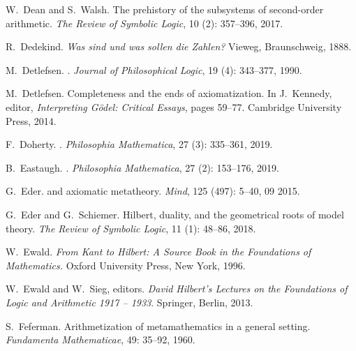 \documentclass[11pt,fleqn,leqno]{article}
\begin{document}
\begin{thebibliography}{118}
W.~Dean and S.~Walsh.
\newblock The prehistory of the subsystems of second-order arithmetic.
\newblock \emph{The Review of Symbolic Logic}, 10 (2):
  357--396, 2017.

R.~Dedekind.
\newblock \emph{Was sind und was sollen die {Z}ahlen?}
\newblock Vieweg, Braunschweig, 1888.

M.~Detlefsen.
.
\newblock \emph{Journal of Philosophical Logic}, 19 (4):
  343--377, 1990.

M.~Detlefsen.
\newblock Completeness and the ends of axiomatization.
\newblock In J.~Kennedy, editor, \emph{Interpreting G{\"o}del: Critical
  Essays}, pages 59--77. Cambridge University Press, 2014.

F.~Doherty.
.
\newblock \emph{Philosophia Mathematica}, 27 (3): 335--361,
  2019.

B.~Eastaugh.
.
\newblock \emph{Philosophia Mathematica}, 27 (2): 153--176,
  2019.

G.~Eder.
 and axiomatic metatheory.
\newblock \emph{Mind}, 125 (497): 5--40, 09 2015.

G.~Eder and G.~Schiemer.
\newblock Hilbert, duality, and the geometrical roots of model theory.
\newblock \emph{The Review of Symbolic Logic}, 11 (1):
  48--86, 2018.

W.~Ewald.
\newblock \emph{From {K}ant to {H}ilbert: {A} {S}ource {B}ook in the
  {F}oundations of {M}athematics.}
\newblock Oxford University Press, New York, 1996.

W.~Ewald and W.~Sieg, editors.
\newblock \emph{{David Hilbert's Lectures on the Foundations of Logic and
  Arithmetic 1917 -- 1933}}.
\newblock Springer, Berlin, 2013.

S.~Feferman.
\newblock Arithmetization of metamathematics in a general setting.
\newblock \emph{Fundamenta Mathematicae}, 49: 35--92, 1960.


\end{thebibliography}
\end{document}
